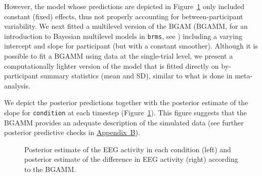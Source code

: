 \documentclass[
  doc,
  floatsintext,
  longtable,
  a4paper,
  nolmodern,
  notxfonts,
  notimes,
  colorlinks=true,linkcolor=blue,citecolor=blue,urlcolor=blue]{apa7}
\begin{document}
However, the model whose predictions are depicted in
Figure~\ref{fig-plot-post-slope} only included constant (fixed) effects,
thus not properly accounting for between-participant variability. We
next fitted a multilevel version of the BGAM (BGAMM, for an introduction
to Bayesian multilevel models in \texttt{brms}, see
) including a
varying intercept and slope for participant (but with a constant
smoother). Although it is possible to fit a BGAMM using data at the
single-trial level, we present a computationally lighter version of the
model that is fitted directly on by-participant summary statistics (mean
and SD), similar to what is done in meta-analysis.

We depict the posterior predictions together with the posterior estimate
of the slope for \texttt{condition} at each timestep
(Figure~\ref{fig-plot-post-slope}). This figure suggests that the BGAMM
provides an adequate description of the simulated data (see further
posterior predictive checks in \hyperref[apx-basis]{Appendix~B}).

\begin{figure}[!htb]

\caption{\label{fig-plot-post-slope}Posterior estimate of the EEG
activity in each condition (left) and posterior estimate of the
difference in EEG activity (right) according to the BGAMM.}


\end{figure}%
\end{document}
